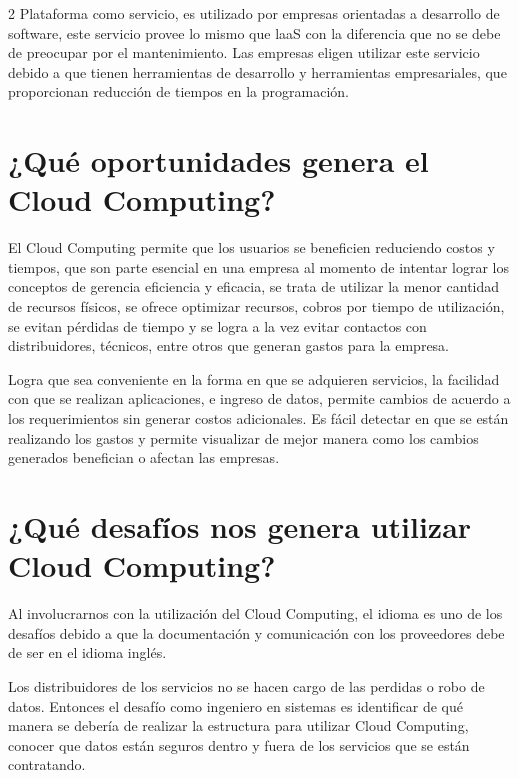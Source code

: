 \documentclass[12pt,spanish,Letterpaper,openany]{book}
\begin{document}
\begin {multicols}{2}
Plataforma como servicio, es utilizado por empresas orientadas a desarrollo de software, este servicio provee lo mismo que laaS con la diferencia que no se debe de preocupar por el mantenimiento. Las empresas eligen utilizar este servicio debido a que tienen herramientas de desarrollo y herramientas empresariales, que proporcionan reducción de tiempos en la programación.

\hypertarget{quuxe9-oportunidades-genera-el-cloud-computing}{%
\section{¿Qué oportunidades genera el Cloud Computing?}\label{quuxe9-oportunidades-genera-el-cloud-computing}}

El Cloud Computing permite que los usuarios se beneficien reduciendo costos y tiempos, que son parte esencial en una empresa al momento de intentar lograr los conceptos de gerencia eficiencia y eficacia, se trata de utilizar la menor cantidad de recursos físicos, se ofrece optimizar recursos, cobros por tiempo de utilización, se evitan pérdidas de tiempo y se logra a la vez evitar contactos con distribuidores, técnicos, entre otros que generan gastos para la empresa.

Logra que sea conveniente en la forma en que se adquieren servicios, la facilidad con que se realizan aplicaciones, e ingreso de datos, permite cambios de acuerdo a los requerimientos sin generar costos adicionales. Es fácil detectar en que se están realizando los gastos y permite visualizar de mejor manera como los cambios generados benefician o afectan las empresas.

\hypertarget{quuxe9-desafuxedos-nos-genera-utilizar-cloud-computing}{%
\section{¿Qué desafíos nos genera utilizar Cloud Computing?}\label{quuxe9-desafuxedos-nos-genera-utilizar-cloud-computing}}

Al involucrarnos con la utilización del Cloud Computing, el idioma es uno de los desafíos debido a que la documentación y comunicación con los proveedores debe de ser en el idioma inglés.

Los distribuidores de los servicios no se hacen cargo de las perdidas o robo de datos. Entonces el desafío como ingeniero en sistemas es identificar de qué manera se debería de realizar la estructura para utilizar Cloud Computing, conocer que datos están seguros dentro y fuera de los servicios que se están contratando.


\end{multicols}
\end{document}
